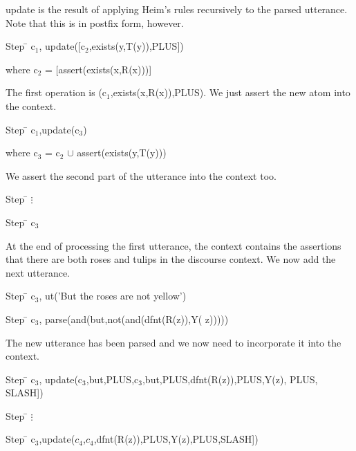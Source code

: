\documentclass{article}
\begin{document}
update is the result of applying Heim's rules recursively to the
parsed utterance. Note that this is in postfix form, however.

\begin{tabbing}
Step \= \> c$_1$, update([c$_2$,exists(y,T(y)),PLUS])
\end{tabbing}

where c$_2$ = [assert(exists(x,R(x)))]

The first operation is (c$_1$,exists(x,R(x)),PLUS). We just assert the
new atom into the context.

\begin{tabbing}
Step \= \> c$_1$,update(c$_3$)
\end{tabbing}

where c$_3$ = c$_2$ $\cup$ assert(exists(y,T(y)))

We assert the second part of the utterance into the context too.

\begin{tabbing}
Step \= \kill
\>$\vdots$
\end{tabbing}

\begin{tabbing}
Step \= \> c$_3$
\end{tabbing}

At the end of processing the first utterance, the context contains the
assertions that there are both roses and tulips in the discourse
context. We now add the next utterance.

\begin{tabbing}
Step \= \> c$_3$, ut('But the roses are not yellow')
\end{tabbing}

\begin{tabbing}
Step \= \> c$_3$, parse(and(but,not(and(dfnt(R(z)),Y( z)))))
\end{tabbing}

The new utterance has been parsed and we now need to incorporate it
into the context.

\begin{tabbing}
Step \= \> c$_3$, update(c$_3$,but,PLUS,c$_3$,but,PLUS,dfnt(R(z)),PLUS,Y(z), PLUS, SLASH])
\end{tabbing}

\begin{tabbing}
Step \= \kill
\>$\vdots$
\end{tabbing}


\begin{tabbing}
Step \= \> c$_3$,update($c_4$,$c_4$,dfnt(R(z)),PLUS,Y(z),PLUS,SLASH])
\end{tabbing}
\end{document}
